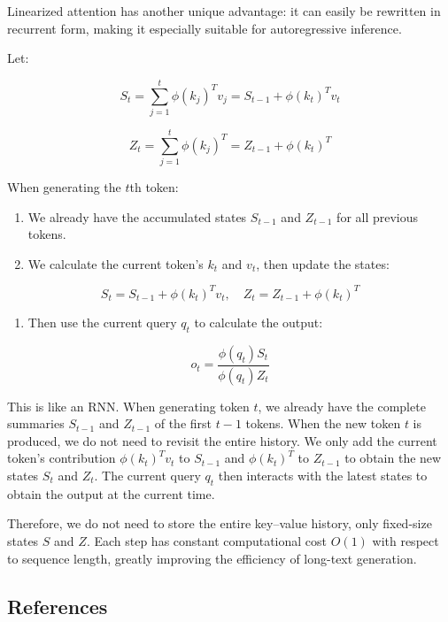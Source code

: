 Linearized attention has another unique advantage: it can easily be rewritten in recurrent form, making it especially suitable for autoregressive inference.

Let:

\[
S_t = \sum_{j=1}^{t}\phi(k_j)^T v_j
= S_{t-1}+\phi(k_t)^T v_t
\]

\[
Z_t = \sum_{j=1}^{t}\phi(k_j)^T
= Z_{t-1}+\phi(k_t)^T
\]

When generating the \(t\)th token:

\begin{enumerate}
\def\labelenumi{\arabic{enumi}.}
\tightlist
\item
  We already have the accumulated states \(S_{t-1}\) and \(Z_{t-1}\) for all previous tokens.
\item
{}
  We calculate the current token's \(k_t\) and \(v_t\), then update the states:
\end{enumerate}

\[
S_t = S_{t-1}+\phi(k_t)^T v_t,\quad
Z_t = Z_{t-1}+\phi(k_t)^T
\]

\begin{enumerate}
\def\labelenumi{\arabic{enumi}.}
\setcounter{enumi}{2}
\tightlist
\item
{}
  Then use the current query \(q_t\) to calculate the output:
\end{enumerate}

\[
o_t = \frac{\phi(q_t)S_t}{\phi(q_t)Z_t}
\]

This is like an RNN. When generating token \(t\), we already have the complete summaries \(S_{t-1}\) and \(Z_{t-1}\) of the first \(t-1\) tokens. When the new token \(t\) is produced, we do not need to revisit the entire history. We only add the current token's contribution \(\phi(k_t)^T v_t\) to \(S_{t-1}\) and \(\phi(k_t)^T\) to \(Z_{t-1}\) to obtain the new states \(S_t\) and \(Z_t\). The current query \(q_t\) then interacts with the latest states to obtain the output at the current time.

Therefore, we do not need to store the entire key--value history, only fixed-size states \(S\) and \(Z\). Each step has constant computational cost \(O(1)\) with respect to sequence length, greatly improving the efficiency of long-text generation.

\FloatBarrier
{}
\hypertarget{references-98}{%
\subsection{References}\label{references-98}}

